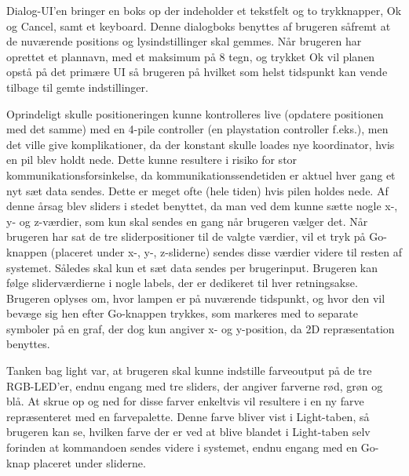 Dialog-UI'en bringer en boks op der indeholder et tekstfelt og to trykknapper, Ok og Cancel, samt et keyboard. Denne dialogboks benyttes af brugeren såfremt at de nuværende positions og lysindstillinger skal gemmes. Når brugeren har oprettet et plannavn, med et maksimum på 8 tegn, og trykket Ok vil planen opstå på det primære UI så brugeren på hvilket som helst tidspunkt kan vende tilbage til gemte indstillinger.
\newline

Oprindeligt skulle positioneringen kunne kontrolleres live (opdatere positionen med det samme) med en 4-pile controller (en playstation controller f.eks.), men det ville give komplikationer, da der konstant skulle loades nye koordinator, hvis en pil blev holdt nede. Dette kunne resultere i risiko for stor kommunikationsforsinkelse, da kommunikationssendetiden er aktuel hver gang et nyt sæt data sendes. Dette er meget ofte (hele tiden) hvis pilen holdes nede. Af denne årsag blev sliders i stedet benyttet, da man ved dem kunne sætte nogle x-, y- og z-værdier, som kun skal sendes en gang når brugeren vælger det. Når brugeren har sat de tre sliderpositioner til de valgte værdier, vil et tryk på Go-knappen (placeret under x-, y-, z-sliderne) sendes disse værdier videre til resten af systemet. Således skal kun et sæt data sendes per brugerinput. Brugeren kan følge sliderværdierne i nogle labels, der er dedikeret til hver retningsakse. Brugeren oplyses om, hvor lampen er på nuværende tidspunkt, og hvor den vil bevæge sig hen efter Go-knappen trykkes, som markeres med to separate symboler på en graf, der dog kun angiver x- og y-position, da 2D repræsentation benyttes.
\newline

Tanken bag light var, at brugeren skal kunne indstille farveoutput på de tre RGB-LED’er, endnu engang med tre sliders, der angiver farverne rød, grøn og blå. At skrue op og ned for disse farver enkeltvis vil resultere i en ny farve repræsenteret med en farvepalette. Denne farve bliver vist i Light-taben, så brugeren kan se, hvilken farve der er ved at blive blandet i Light-taben selv forinden at kommandoen sendes videre i systemet, endnu engang med en Go-knap placeret under sliderne.  
\newline

